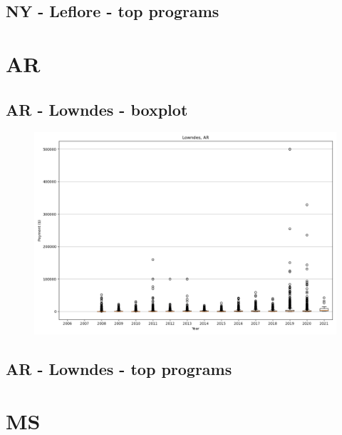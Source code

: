 \subsection*{NY - Leflore - top programs}

\newpage
\section*{AR}
\subsection*{AR - Lowndes - boxplot}
\begin{figure}[h]
\centering
\includegraphics[width=7in]{../output/boxplots/counties/Lowndes-AR_boxplot.png}
\end{figure}


\subsection*{AR - Lowndes - top programs}

\newpage
\section*{MS}

